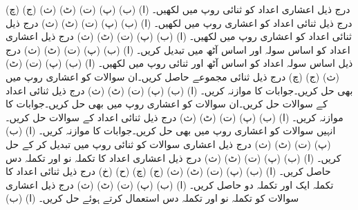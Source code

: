 درج ذیل اعشاری اعداد کو ثنائی روپ  میں لکھیں۔
(ا)		(ب)		(پ)		(ت)	
(ٹ)		(ث)		(ج)		(چ)	
درج ذیل ثنائی اعداد کو اعشاری روپ میں لکھیں۔
(ا)				(ب)			
(پ)				(ت)		
(ٹ)			(ث)				
درج ذیل ثنائی اعداد کو اعشاری روپ  میں لکھیں۔
(ا)				(ب)		
(پ)			(ت)		
(ٹ)			(ث)		
درج ذیل اعشاری اعداد کو اساس سولہ اور اساس آٹھ میں تبدیل کریں۔
(ا)		(ب)		(پ)		(ت)			
(ٹ)		(ث)	
درج ذیل اساس سولہ اعداد کو اساس آٹھ اور ثنائی   روپ  میں لکھیں۔
(ا)		(ب)		(پ)		(ت)		
(ٹ)		(ث)		(ج)		(چ)		
درج ذیل ثنائی  مجموعے حاصل کریں۔ان سوالات کو اعشاری  روپ  میں بھی حل کریں۔جوابات کا موازنہ کریں۔
(ا)				(ب)		
(پ)				(ت)				
(ٹ)				(ث)			
درج ذیل ثنائی اعداد کے سوالات حل کریں۔ان سوالات کو اعشاری  روپ میں بھی حل کریں۔جوابات کا موازنہ کریں۔
(ا)				(ب)		
(پ)				(ت)				
(ٹ)				(ث)	
درج ذیل ثنائی اعداد کے سوالات حل کریں۔انہیں سوالات کو اعشاری  روپ  میں بھی حل کریں۔جوابات کا موازنہ کریں۔
(ا)				(ب)		
(پ)				(ت)				
(ٹ)			(ث)	
درج ذیل اعشاری سوالات کو ثنائی روپ میں تبدیل کر کے حل کریں۔
(ا)				(ب)			
(پ)			(ت)				
(ٹ)			(ث)						
درج ذیل اعشاری اعداد کا تکملہ نو اور تکملہ دس حاصل کریں۔
(ا)				(ب)				
(پ)				(ت)				
(ٹ)			(ث)				
(ج)				(چ)				
(ح)			(خ)				
درج ذیل ثنائی اعداد کا  تکملہ ایک اور تکملہ دو حاصل کریں۔
(ا)				(ب)				
(پ)			(ت)				
(ٹ)				(ث)				
درج ذیل اعشاری سوالات کو تکملہ نو اور تکملہ دس  استعمال کرتے ہوئے  حل کریں۔
(ا)				(ب)				
